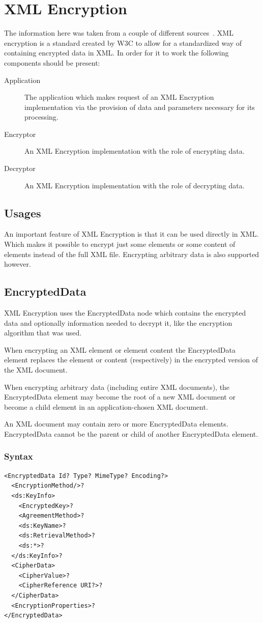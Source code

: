 \section{XML Encryption}
The information here was taken from a couple of different
sources~\autocites{w3c_xml_encryption}{wiki_xml_encryption}{hamburg_xml_encryption}.
XML encryption is a standard created by W3C to allow for a standardized way of
containing encrypted data in XML\@. In order for it to work the following
components should be present:

\begin{description}
    \item[Application] The application which makes request of an XML Encryption
        implementation via the provision of data and parameters necessary for
        its processing.
    \item[Encryptor] An XML Encryption implementation with the role of encrypting
        data.
    \item[Decryptor] An XML Encryption implementation with the role of decrypting
        data.
\end{description}
\subsection{Usages}
An important feature of XML Encryption is that it can be used directly in XML\@.
Which makes it possible to encrypt just some elements or some content of
elements instead of the full XML file. Encrypting arbitrary data is also
supported however.
\subsection{EncryptedData}
XML Encryption uses the EncryptedData node which contains the encrypted data and
optionally information needed to decrypt it, like the encryption algorithm that
was used.

When encrypting an XML element or element content the EncryptedData element
replaces the element or content (respectively) in the encrypted version of the
XML document.

When encrypting arbitrary data (including entire XML documents), the
EncryptedData element may become the root of a new XML document or become a
child element in an application-chosen XML document.

An XML document may contain zero or more EncryptedData elements. EncryptedData
cannot be the parent or child of another EncryptedData element.
\subsubsection{Syntax}
\begin{verbatim}
<EncryptedData Id? Type? MimeType? Encoding?>
  <EncryptionMethod/>?
  <ds:KeyInfo>
    <EncryptedKey>?
    <AgreementMethod>?
    <ds:KeyName>?
    <ds:RetrievalMethod>?
    <ds:*>?
  </ds:KeyInfo>?
  <CipherData>
    <CipherValue>?
    <CipherReference URI?>?
  </CipherData>
  <EncryptionProperties>?
</EncryptedData>
\end{verbatim}

